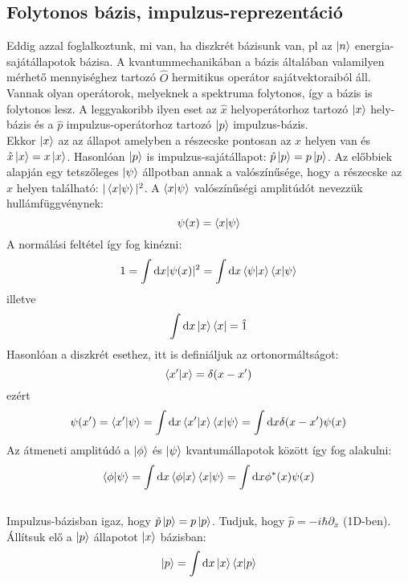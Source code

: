 \documentclass[12pt]{article}
\theoremstyle{plain}
\newcommand{\dd}{\mathrm{d}}
\begin{document}
\subsection{Folytonos bázis, impulzus-reprezentáció}
Eddig azzal foglalkoztunk, mi van, ha diszkrét bázisunk van, pl az $\ket n$ energia-sajátállapotok bázisa. 
A kvantummechanikában a bázis általában valamilyen mérhető mennyiséghez tartozó $\hat O$ hermitikus operátor sajátvektoraiból áll.
Vannak olyan operátorok, melyeknek a spektruma folytonos, így a bázis is folytonos lesz.
A leggyakoribb ilyen eset az $\hat x$ helyoperátorhoz tartozó $\ket x$ hely-bázis és a $\hat p$ impulzus-operátorhoz
tartozó $\ket p$ impulzus-bázis.
\\
Ekkor $\ket x$ az az állapot amelyben a részecske pontosan az $x$ helyen van és $\hat x\ket x = x\ket x$.
Hasonlóan $\ket p$ is impulzus-sajátállapot: $\hat p\ket p = p\ket p$.
Az előbbiek alapján egy tetszőleges $\ket\psi$ állpotban annak a valószínűsége, hogy a részecske az $x$ helyen található:
$|\braket{x|\psi}|^2$. A $\braket{x|\psi}$ valószínűségi amplitúdót nevezzük hullámfüggvénynek:
\begin{equation}
    \psi(x)=\braket{x|\psi}
\end{equation}
A normálási feltétel így fog kinézni:
\begin{equation}
    1 = \int\dd x |\psi(x)|^2 = \int\dd x \braket{\psi|x}\braket{x|\psi}
\end{equation} 
illetve
\begin{equation}
    \int\dd x \ket x \bra x = \hat 1
\end{equation}
Hasonlóan a diszkrét esethez, itt is definiáljuk az ortonormáltságot:
\begin{equation}
    \braket{x'|x} = \delta(x-x')
\end{equation}
ezért 
\begin{equation}
    \psi(x') = \braket{x'|\psi} = \int\dd x \braket{x'|x}\braket{x|\psi} = \int\dd x \delta (x-x')\psi(x)
\end{equation}
Az átmeneti amplitúdó a $\ket\phi$ és $\ket\psi$ kvantumállapotok között így fog alakulni:
\begin{equation}
    \braket{\phi|\psi} = \int\dd x \braket{\phi|x}\braket{x|\psi} = \int\dd x \phi^{*}(x)\psi(x)
\end{equation}
\\
Impulzus-bázisban igaz, hogy $\hat p \ket p = p\ket p$. Tudjuk, hogy $\hat p = -i\hbar\partial_x$ (1D-ben).
Állítsuk elő a $\ket p$ állapotot $\ket x$ bázisban:
\begin{equation}
    \ket p = \int\dd x \ket x \braket{x|p}
\end{equation}
\end{document}
